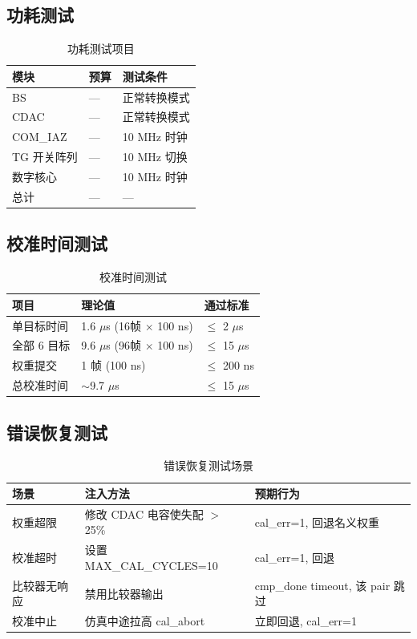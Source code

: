 \documentclass[UTF8,a4paper,11pt]{ctexart}
\providecommand{\textmu}{\ensuremath{\mu}}
\begin{document}
\subsection{功耗测试}

\begin{table}[H]
\centering
\caption{功耗测试项目}
\label{tab:power-test}
\begin{tabular}{lll}
\toprule
模块 & 预算 & 测试条件 \\
\midrule
BS            & --- & 正常转换模式 \\
CDAC          & --- & 正常转换模式 \\
COM\_IAZ      & --- & 10 MHz 时钟 \\
TG 开关阵列   & --- & 10 MHz 切换 \\
数字核心      & --- & 10 MHz 时钟 \\
总计          & --- & --- \\
\bottomrule
\end{tabular}
\end{table}

\subsection{校准时间测试}

\begin{table}[H]
\centering
\caption{校准时间测试}
\label{tab:cal-time-test}
\begin{tabular}{lll}
\toprule
项目 & 理论值 & 通过标准 \\
\midrule
单目标时间   & 1.6 \textmu s (16帧 $\times$ 100 ns) & $\leq$ 2 \textmu s \\
全部 6 目标  & 9.6 \textmu s (96帧 $\times$ 100 ns) & $\leq$ 15 \textmu s \\
权重提交     & 1 帧 (100 ns)                       & $\leq$ 200 ns \\
总校准时间   & $\sim$9.7 \textmu s                 & $\leq$ 15 \textmu s \\
\bottomrule
\end{tabular}
\end{table}

\subsection{错误恢复测试}

\begin{table}[H]
\centering
\caption{错误恢复测试场景}
\label{tab:error-recovery}
\begin{tabular}{lll}
\toprule
场景 & 注入方法 & 预期行为 \\
\midrule
权重超限       & 修改 CDAC 电容使失配 $>$ 25\% & cal\_err=1, 回退名义权重 \\
校准超时       & 设置 MAX\_CAL\_CYCLES=10       & cal\_err=1, 回退 \\
比较器无响应   & 禁用比较器输出                  & cmp\_done timeout, 该 pair 跳过 \\
校准中止       & 仿真中途拉高 cal\_abort         & 立即回退, cal\_err=1 \\
\bottomrule
\end{tabular}
\end{table}
\end{document}
